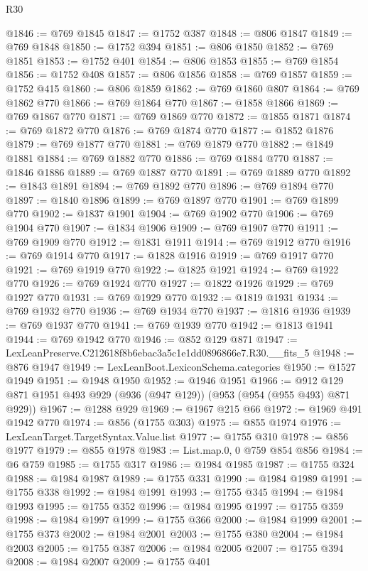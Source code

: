 \begin{lexlean}{R30}
\begin{coremodule}
@1846 := @769 @1845
@1847 := @1752 @387
@1848 := @806 @1847
@1849 := @769 @1848
@1850 := @1752 @394
@1851 := @806 @1850
@1852 := @769 @1851
@1853 := @1752 @401
@1854 := @806 @1853
@1855 := @769 @1854
@1856 := @1752 @408
@1857 := @806 @1856
@1858 := @769 @1857
@1859 := @1752 @415
@1860 := @806 @1859
@1862 := @769 @1860 @807
@1864 := @769 @1862 @770
@1866 := @769 @1864 @770
@1867 := @1858 @1866
@1869 := @769 @1867 @770
@1871 := @769 @1869 @770
@1872 := @1855 @1871
@1874 := @769 @1872 @770
@1876 := @769 @1874 @770
@1877 := @1852 @1876
@1879 := @769 @1877 @770
@1881 := @769 @1879 @770
@1882 := @1849 @1881
@1884 := @769 @1882 @770
@1886 := @769 @1884 @770
@1887 := @1846 @1886
@1889 := @769 @1887 @770
@1891 := @769 @1889 @770
@1892 := @1843 @1891
@1894 := @769 @1892 @770
@1896 := @769 @1894 @770
@1897 := @1840 @1896
@1899 := @769 @1897 @770
@1901 := @769 @1899 @770
@1902 := @1837 @1901
@1904 := @769 @1902 @770
@1906 := @769 @1904 @770
@1907 := @1834 @1906
@1909 := @769 @1907 @770
@1911 := @769 @1909 @770
@1912 := @1831 @1911
@1914 := @769 @1912 @770
@1916 := @769 @1914 @770
@1917 := @1828 @1916
@1919 := @769 @1917 @770
@1921 := @769 @1919 @770
@1922 := @1825 @1921
@1924 := @769 @1922 @770
@1926 := @769 @1924 @770
@1927 := @1822 @1926
@1929 := @769 @1927 @770
@1931 := @769 @1929 @770
@1932 := @1819 @1931
@1934 := @769 @1932 @770
@1936 := @769 @1934 @770
@1937 := @1816 @1936
@1939 := @769 @1937 @770
@1941 := @769 @1939 @770
@1942 := @1813 @1941
@1944 := @769 @1942 @770
@1946 := @852 @129 @871
@1947 := LexLeanPreserve.C212618f8b6ebac3a5c1e1dd0896866e7.R30.__fits_5
@1948 := @876 @1947
@1949 := LexLeanBoot.LexiconSchema.categories
@1950 := @1527 @1949
@1951 := @1948 @1950
@1952 := @1946 @1951
@1966 := @912 @129 @871 @1951 @493 @929 (@936 (@947 @129)) (@953 (@954 (@955 @493) @871 @929))
@1967 := @1288 @929
@1969 := @1967 @215 @66
@1972 := @1969 @491 @1942 @770
@1974 := @856 (@1755 @303)
@1975 := @855 @1974
@1976 := LexLeanTarget.TargetSyntax.Value.list
@1977 := @1755 @310
@1978 := @856 @1977
@1979 := @855 @1978
@1983 := List.map.{0, 0} @759 @854 @856
@1984 := @6 @759
@1985 := @1755 @317
@1986 := @1984 @1985
@1987 := @1755 @324
@1988 := @1984 @1987
@1989 := @1755 @331
@1990 := @1984 @1989
@1991 := @1755 @338
@1992 := @1984 @1991
@1993 := @1755 @345
@1994 := @1984 @1993
@1995 := @1755 @352
@1996 := @1984 @1995
@1997 := @1755 @359
@1998 := @1984 @1997
@1999 := @1755 @366
@2000 := @1984 @1999
@2001 := @1755 @373
@2002 := @1984 @2001
@2003 := @1755 @380
@2004 := @1984 @2003
@2005 := @1755 @387
@2006 := @1984 @2005
@2007 := @1755 @394
@2008 := @1984 @2007
@2009 := @1755 @401

\end{coremodule}
\end{lexlean}
